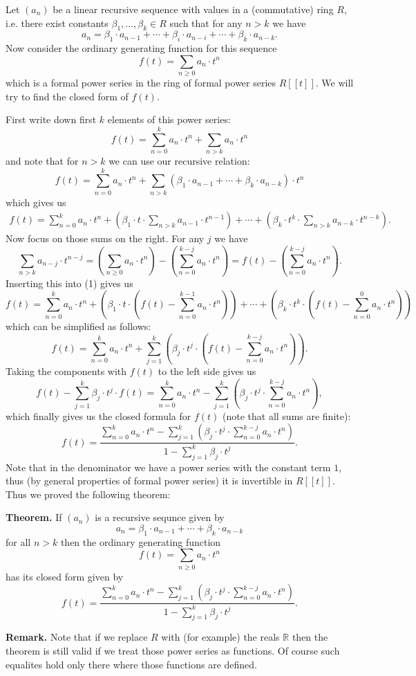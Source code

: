 \documentclass[12pt]{article}
\begin{document}
Let $(a_n)$ be a linear recursive sequence with values in a (commutative) ring $R$, i.e. there exist constants $\beta_1,\ldots,\beta_k\in R$ such that for any $n>k$ we have
$$a_n=\beta_1\cdot a_{n-1} + \cdots + \beta_i\cdot a_{n-i} + \cdots + \beta_{k}\cdot a_{n-k}.$$
Now consider the ordinary generating function for this sequence
$$f(t)=\sum_{n\geqslant 0}a_n\cdot t^n$$
which is a formal power series in the ring of formal power series $R[[t]]$. We will try to find the closed form of $f(t)$.

First write down first $k$ elements of this power series:
$$f(t)=\sum_{n=0}^{k}a_n\cdot t^n + \sum_{n>k}a_n\cdot t^n$$
and note that for $n>k$ we can use our recursive relation:
$$f(t)=\sum_{n=0}^{k}a_n\cdot t^n + \sum_{n>k}(\beta_1\cdot a_{n-1}+\cdots +\beta_k\cdot a_{n-k})\cdot t^n$$
which gives us
\begin{align}
f(t)=\sum_{n=0}^{k}a_n\cdot t^n + \left(\beta_1\cdot t\cdot \sum_{n>k}a_{n-1}\cdot t^{n-1}\right) +\cdots +\left(\beta_k\cdot t^k\cdot \sum_{n>k}a_{n-k}\cdot t^{n-k}\right).
\end{align}
Now focus on those sums on the right. For any $j$ we have
$$\sum_{n>k}a_{n-j}\cdot t^{n-j} = \left(\sum_{n\geqslant 0}a_n\cdot t^n \right) - \left(\sum_{n=0}^{k-j}a_n\cdot t^n\right) = f(t) - \left(\sum_{n=0}^{k-j}a_n\cdot t^n\right).$$
Inserting this into (1) gives us
$$f(t) = \sum_{n=0}^{k}a_n\cdot t^n + \left(\beta_1\cdot t\cdot(f(t)-\sum_{n=0}^{k-1}a_n\cdot t^n)\right) + \cdots + \left(\beta_k\cdot t^k\cdot(f(t)-\sum_{n=0}^{0}a_n\cdot t^n)\right)$$
which can be simplified as follows:
$$f(t) = \sum_{n=0}^{k}a_n\cdot t^n  + \sum_{j=1}^{k}\left(\beta_j\cdot t^j\cdot(f(t)-\sum_{n=0}^{k-j}a_n\cdot t^n)\right).$$
Taking the components with $f(t)$ to the left side gives us
$$f(t)-\sum_{j=1}^{k}\beta_j\cdot t^j\cdot f(t) = \sum_{n=0}^{k}a_n\cdot t^n  - \sum_{j=1}^{k}\left(\beta_j\cdot t^j\cdot\sum_{n=0}^{k-j}a_n\cdot t^n\right),$$
which finally gives us the closed formula for $f(t)$ (note that all sums are finite):
$$f(t)=\frac{\sum\limits_{n=0}^{k}a_n\cdot t^n - \sum\limits_{j=1}^{k}\left(\beta_j\cdot t^j\cdot\sum\limits_{n=0}^{k-j}a_n\cdot t^n\right)}{1-\sum\limits_{j=1}^{k}\beta_j\cdot t^j}.$$
Note that in the denominator we have a power series with the constant term $1$, thus (by general properties of formal power series) it is invertible in $R[[t]]$. Thus we proved the following theorem:

\textbf{Theorem.} If $(a_n)$ is a recursive sequnce given by 
$$a_n=\beta_1\cdot a_{n-1}+\cdots+\beta_k\cdot a_{n-k}$$
for all $n>k$ then the ordinary generating function
$$f(t)=\sum_{n\geqslant 0}a_n\cdot t^n$$
has its closed form given by
$$f(t)=\frac{\sum\limits_{n=0}^{k}a_n\cdot t^n  - \sum\limits_{j=1}^{k}\left(\beta_j\cdot t^j\cdot\sum\limits_{n=0}^{k-j}a_n\cdot t^n\right)}{1-\sum\limits_{j=1}^{k}\beta_j\cdot t^j}.$$

\textbf{Remark.} Note that if we replace $R$ with (for example) the reals $\mathbb{R}$ then the theorem is still valid if we treat those power series as functions. Of course such equalites hold only there where those functions are defined.
\end{document}
